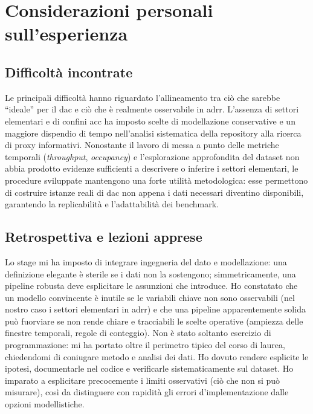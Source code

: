 \section{Considerazioni personali sull’esperienza}
\subsection{Difficoltà incontrate}
Le principali difficoltà hanno riguardato l’allineamento tra ciò che sarebbe “ideale” per il \gls{dac} e ciò che è realmente osservabile in \gls{adrr}. L’assenza di settori elementari e di confini \gls{acc} ha imposto scelte di modellazione conservative e un maggiore dispendio di tempo nell’analisi sistematica della repository alla ricerca di proxy informativi. Nonostante il lavoro di messa a punto delle metriche temporali (\emph{throughput}, \emph{occupancy}) e l’esplorazione approfondita del dataset non abbia prodotto evidenze sufficienti a descrivere o inferire i settori elementari, le procedure sviluppate mantengono una forte utilità metodologica: esse permettono di costruire istanze reali di \gls{dac} non appena i dati necessari diventino disponibili, garantendo la replicabilità e l’adattabilità dei benchmark.

\subsection{Retrospettiva e lezioni apprese}
Lo stage mi ha imposto di integrare ingegneria del dato e modellazione: una definizione elegante è sterile se i dati non la sostengono; simmetricamente, una pipeline robusta deve esplicitare le assunzioni che introduce. Ho constatato che un modello convincente è inutile se le variabili chiave non sono osservabili (nel nostro caso i settori elementari in \gls{adrr}) e che una pipeline apparentemente solida può fuorviare se non rende chiare e tracciabili le scelte operative (ampiezza delle finestre temporali, regole di conteggio).
Non è stato soltanto esercizio di programmazione: mi ha portato oltre il perimetro tipico del corso di laurea, chiedendomi di coniugare metodo e analisi dei dati. Ho dovuto rendere esplicite le ipotesi, documentarle nel codice e verificarle sistematicamente sul dataset. Ho imparato a esplicitare precocemente i limiti osservativi (ciò che non si può misurare), così da distinguere con rapidità gli errori d’implementazione dalle opzioni modellistiche.

